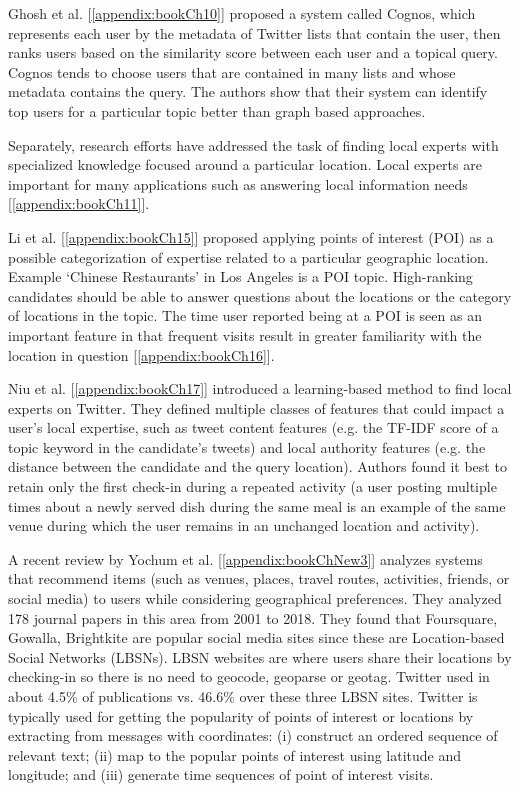 Ghosh et al. [\ref{appendix:bookCh10}] proposed a system called Cognos, which represents each user by the metadata of Twitter lists that contain the user, then ranks users based on %
the similarity score between each user and a topical query.
Cognos tends to choose users that are contained in many lists and whose metadata contains the query. The authors show that their system can identify top users for a particular topic better than graph based approaches. 

Separately, research efforts have addressed the task of finding local experts %
with specialized knowledge focused around a particular location. Local experts are important for many applications such as answering local information needs [\ref{appendix:bookCh11}]. 

Li et al. [\ref{appendix:bookCh15}] proposed applying points of interest (POI) as a possible categorization of expertise related to a particular geographic location. Example `Chinese Restaurants' in Los Angeles is a POI topic. High-ranking candidates should be able to answer questions about the locations or the category of locations in the topic. The time user reported being at a POI is seen as an important feature in that frequent visits result in greater familiarity with the location in question [\ref{appendix:bookCh16}]. 

Niu  et  al.  [\ref{appendix:bookCh17}]  introduced  a  learning-based  method  to find  local  experts  on  Twitter.  They  defined  multiple  classes  of features that could impact a user's local expertise, such as tweet content  features  (e.g.  the  TF-IDF  score  of  a topic  keyword  in  the candidate's tweets) and local authority features  (e.g. the  distance between the candidate and the query location). Authors found it best to  retain only the first check-in during a repeated activity (a user posting multiple times about a newly served dish during the same meal is an example of the same venue during which the user remains in an unchanged location and activity). 

A recent review by Yochum et al. [\ref{appendix:bookChNew3}] analyzes systems that recommend items (such as venues, places, travel routes, activities, friends, or social media) to users while considering geographical preferences. They analyzed 178 journal papers in this area from 2001 to 2018. They found that Foursquare, Gowalla, Brightkite are popular social media sites since these are Location-based Social Networks (LBSNs). LBSN websites are where users share their locations by checking-in so there is no need to geocode, geoparse or geotag. Twitter used in about 4.5\% of publications vs. 46.6\% over these three LBSN sites. Twitter is typically used for getting the popularity of points of interest or locations by extracting from messages with coordinates: (i) construct an ordered sequence of relevant text; (ii) map to the popular points of interest using latitude and longitude; and (iii) generate time sequences of point of interest visits. 

